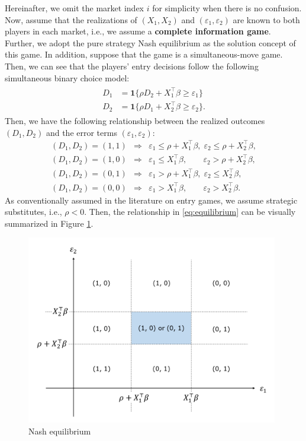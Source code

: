 \documentclass[10.5pt, A4paper, openany, uplatex]{book}
\newcommand{\mbf}{\mathbf}
\newcommand{\eps}{\varepsilon}
\numberwithin{equation}{section}
\begin{document}
Hereinafter, we omit the market index $i$ for simplicity when there is no confusion.
Now, assume that the realizations of $(X_1, X_2)$ and $(\eps_1, \eps_2)$ are known to both players in each market, i.e., we assume a \textbf{complete information game}.
Further, we adopt the pure strategy Nash equilibrium as the solution concept of this game.
In addition, suppose that the game is a simultaneous-move game.
Then, we can see that the players' entry decisions follow the following simultaneous binary choice model:
\begin{align}\label{eq:entry}
\begin{split}
D_1 & = \mbf{1}\{\rho D_2 + X_1^\top \beta \geq \eps_1 \} \\
D_2 & = \mbf{1}\{\rho D_1 + X_2^\top \beta \geq \eps_2 \}.
\end{split}
\end{align}
Then, we have the following relationship between the realized outcomes $(D_1, D_2)$ and the error terms $(\eps_1, \eps_2)$:
\begin{equation} \label{eq:equilibrium}
\begin{array}{lcl}
(D_1, D_2) = (1, 1) & \Longrightarrow & \eps_1 \le \rho + X_1^\top \beta, \; \eps_2 \le \rho + X_2^\top\beta, \\
(D_1, D_2) = (1, 0) & \Longrightarrow & \eps_1 \le X_1^\top \beta, \;\;\;\;\;\;\;  \eps_2 > \rho + X_2^\top\beta, \\
(D_1, D_2) = (0, 1) & \Longrightarrow & \eps_1 > \rho + X_1^\top \beta, \; \eps_2 \le X_2^\top\beta, \\
(D_1, D_2) = (0, 0) & \Longrightarrow & \eps_1 > X_1^\top \beta, \;\;\;\;\;\;\; \eps_2 > X_2^\top\beta.
\end{array}
\end{equation}
As conventionally assumed in the literature on entry games, we assume strategic substitutes, i.e., $\rho < 0$.
Then, the relationship in \eqref{eq:equilibrium} can be visually summarized in Figure \ref{fig:nash}.
\begin{figure}[h!]
	\begin{center}
		\includegraphics[width = 11cm]{fig_nash.png}
		\caption{Nash equilibrium}
		\label{fig:nash}
	\end{center}
\end{figure}
\end{document}
